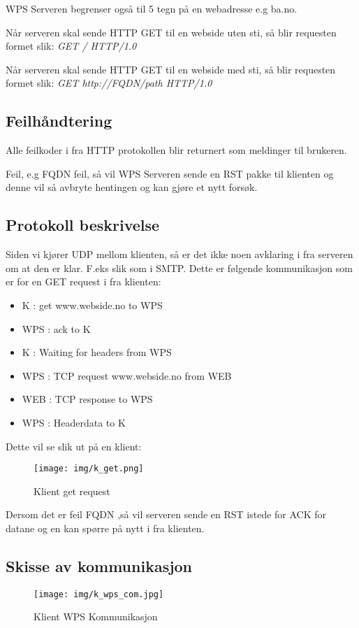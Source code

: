 \documentclass[norsk,a4paper]{article}
\begin{document}
WPS Serveren begrenser også til 5 tegn på en webadresse e.g ba.no.

Når serveren skal sende HTTP GET til en webside uten sti,
så blir requesten formet slik: \textit{GET / HTTP/1.0}

Når serveren skal sende HTTP GET til en webside med sti,
så blir requesten formet slik: \textit{GET http://FQDN/path HTTP/1.0}
\clearpage
\subsection{Feilhåndtering}

Alle feilkoder i fra HTTP protokollen blir returnert som meldinger til brukeren.

Feil, e.g FQDN feil, så vil WPS Serveren sende en RST pakke til klienten og denne vil så avbryte hentingen og kan gjøre et nytt forsøk.

\subsection{Protokoll beskrivelse}

Siden vi kjører UDP mellom klienten,
så er det ikke noen avklaring i fra serveren om at den er klar.
F.eks slik som i SMTP.
Dette er følgende kommunikasjon som er for en GET request i fra klienten:
\begin{itemize}
  \item K   : get www.webside.no to WPS
  \item WPS : ack to K
  \item K   : Waiting for headers from WPS
  \item WPS : TCP request www.webside.no from WEB
  \item WEB : TCP response to WPS
  \item WPS : Headerdata to K
\end{itemize}

Dette vil se slik ut på en klient:
\begin{figure}[ht!]
  \texttt{[image: img/k\_get.png]}
  \caption{Klient get request}
  \label{fig:klient_get}
\end{figure}

Dersom det er feil FQDN ,så vil serveren sende en RST istede for ACK for datane og en kan spørre på nytt i fra klienten.

\clearpage

\subsection{Skisse av kommunikasjon}

\begin{figure}[ht!]
  \texttt{[image: img/k\_wps\_com.jpg]}
  \caption{Klient WPS Kommunikasjon}
  \label{fig:k_wps_com}
\end{figure}
\end{document}
